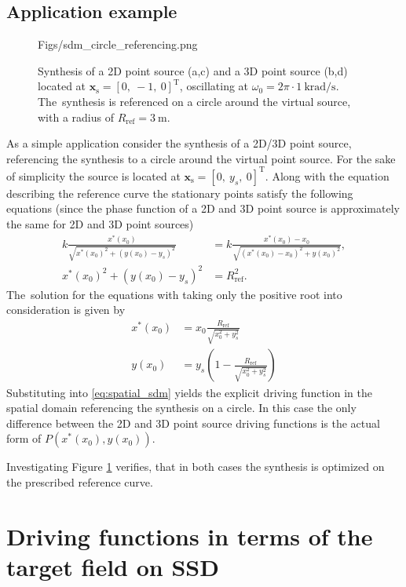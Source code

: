 \documentclass[12pt,a4paper]{article}
\newcommand{\vxs}{\mathbf{x}_{\mathrm{s}}}
\begin{document}
\subsection{Application example}
\begin{figure}
	\centering
	\begin{overpic}[width = .95\columnwidth ]{Figs/sdm_circle_referencing.png}
	\scriptsize
	\end{overpic}
	\caption{Synthesis of a 2D point source (a,c) and a 3D point source (b,d) located at $\vxs = [0,\ -1,\ 0]^\mathrm{T}$, oscillating at $\omega_0 = 2\pi \cdot 1 ~\mathrm{krad/s}$.
	The~synthesis is referenced on a circle around the virtual source, with a radius of $R_{\mathrm{ref}} = 3~\mathrm{m}$.}
	\label{fig:sdm_spatial_1}
\end{figure}
As a simple application consider the synthesis of a 2D/3D point source, referencing the synthesis to a circle around the virtual point source.
For the sake of simplicity the source is located at $\vxs = [0,\ y_s,\ 0]^{\mathrm{T}}$. Along with the equation describing the reference curve the stationary points satisfy the following equations (since the phase function of a 2D and 3D point source is approximately the same for 2D and 3D point sources)
\begin{align}
k \frac{x^*(x_0)}{\sqrt{x^*(x_0)^2 + (y(x_0)-y_s)^2}} &= k \frac{x^*(x_0)-x_0}{\sqrt{(x^*(x_0)-x_0)^2 + y(x_0)^2}}, \\
x^*(x_0)^2 + (y(x_0)-y_s)^2     &= R_{\mathrm{ref}}^2.
\end{align}
The~solution for the equations with taking only the positive root into consideration is given by
\begin{align}
x^*(x_0) &= x_0 \frac{ R_{\mathrm{ref}}}{\sqrt{x_0^2 + y_s^2}} \\
y(x_0) 	 &= y_s \left( 1 -  \frac{R_{\mathrm{ref}}}{\sqrt{x_0^2 + y_s^2}}\right)
\end{align}
Substituting into \eqref{eq:spatial_sdm} yields the explicit driving function in the spatial domain referencing the synthesis on a circle.
In this case the only difference between the 2D and 3D point source driving functions is the actual form of $P(x^*(x_0),y(x_0))$.

Investigating Figure \ref{fig:sdm_spatial_1} verifies, that in both cases the synthesis is optimized on the prescribed reference curve.

\newpage
\section{Driving functions in terms of the target field on SSD}
\end{document}
